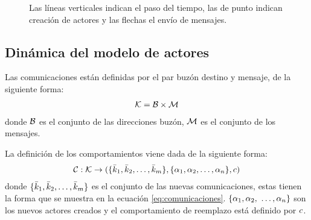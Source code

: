 \begin{figure}[H]
\begin{subfigure}{.5\textwidth}

\caption{}
\label{fig:actores:crecion:b}
\end{subfigure}

\caption{Las líneas verticales indican el paso del tiempo, las de punto indican creación de actores y las flechas el envío de mensajes.}
\label{fig:actores:crecion}
\end{figure}


\subsection{Dinámica del modelo de actores}

Las comunicaciones están definidas por el par buzón destino y mensaje, de la siguiente forma:
\begin{align}\label{eq:comunicaciones}
\mathcal{K} = \mathcal{B} \times \mathcal{M}
\end{align}
donde $\mathcal{B}$ es el conjunto de las direcciones buzón, $\mathcal{M}$ es el conjunto de los mensajes. 

La definición de los comportamientos viene dada de la siguiente forma:
\begin{align}\label{eq:comportamientos}
\mathcal{C} : \mathcal{K} \rightarrow ( \{ \bar{k}_1, \bar{k}_2, \ldots, \bar{k}_m \}, \{ \alpha_1, \alpha_2, \ldots, \alpha_n \}, c )
\end{align}
donde $\{ \bar{k}_1, \bar{k}_2, \ldots, \bar{k}_m \}$ es el conjunto de las nuevas comunicaciones, estas tienen la forma que se muestra en la ecuación \eqref{eq:comunicaciones}. $\{ \alpha_1, \alpha_2,$ $ \ldots, \alpha_n \}$ son los nuevos actores creados y el comportamiento de reemplazo está definido por $c$.

